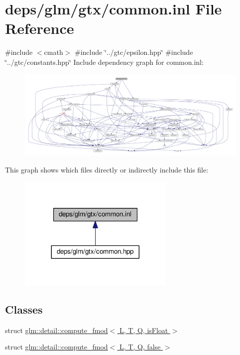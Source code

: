 \hypertarget{common_8inl}{}\section{deps/glm/gtx/common.inl File Reference}
\label{common_8inl}
{\ttfamily \#include $<$cmath$>$}\newline
{\ttfamily \#include \char`\"{}../gtc/epsilon.\+hpp\char`\"{}}\newline
{\ttfamily \#include \char`\"{}../gtc/constants.\+hpp\char`\"{}}\newline
Include dependency graph for common.\+inl\+:
\nopagebreak
\begin{figure}[H]
\begin{center}
\leavevmode
\includegraphics[width=350pt]{d9/d1a/common_8inl__incl}
\end{center}
\end{figure}
This graph shows which files directly or indirectly include this file\+:
\nopagebreak
\begin{figure}[H]
\begin{center}
\leavevmode
\includegraphics[width=212pt]{df/d50/common_8inl__dep__incl}
\end{center}
\end{figure}
\subsection*{Classes}
\begin{DoxyCompactItemize}
\item 
struct \hyperlink{structglm_1_1detail_1_1compute__fmod}{glm\+::detail\+::compute\+\_\+fmod$<$ L, T, Q, is\+Float $>$}
\item 
struct \hyperlink{structglm_1_1detail_1_1compute__fmod_3_01L_00_01T_00_01Q_00_01false_01_4}{glm\+::detail\+::compute\+\_\+fmod$<$ L, T, Q, false $>$}
\end{DoxyCompactItemize}

